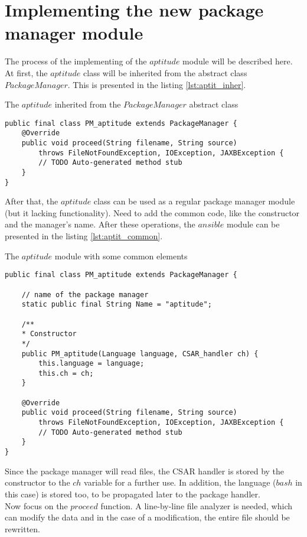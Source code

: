 \section{Implementing the new package manager module}\label{sec:aptitude_imp}
The process of the implementing of the $aptitude$ module will be described here.
At first, the $aptitude$ class will be inherited from the abstract class $PackageManager$. 
This is presented in the listing \ref{lst:aptit_inher}.\\
\begin{Listing} 
\caption{The $aptitude$ inherited from the $PackageManager$ abstract class}
\label{lst:aptit_inher}
\begin{lstlisting}
public final class PM_aptitude extends PackageManager {
	@Override
	public void proceed(String filename, String source)
		throws FileNotFoundException, IOException, JAXBException {
		// TODO Auto-generated method stub
	}
}
\end{lstlisting}
\end{Listing} 
After that, the $aptitude$ class can be used as a regular package manager module (but it lacking functionality).
Need to add the common code, like the constructor and the manager's name.
After these operations, the $ansible$ module can be presented in the listing \ref{lst:aptit_common}.\\
\begin{Listing} 
\caption{The $aptitude$ module with some common elements}
\label{lst:aptit_common}
\begin{lstlisting}
public final class PM_aptitude extends PackageManager {

	// name of the package manager
	static public final String Name = "aptitude";
	
	/**
	* Constructor
	*/
	public PM_aptitude(Language language, CSAR_handler ch) {
		this.language = language;
		this.ch = ch;
	}
	
	@Override
	public void proceed(String filename, String source)
		throws FileNotFoundException, IOException, JAXBException {
		// TODO Auto-generated method stub
	}
}
\end{lstlisting}
\end{Listing} 
Since the package manager will read files, the CSAR handler is stored by the constructor to the $ch$ variable for a further use.
In addition, the language ($bash$ in this case) is stored too, to be propagated later to the package handler.\\
Now focus on the $proceed$ function.
A line-by-line file analyzer is needed, which can modify the data and in the case of a modification, the entire file should be rewritten.

